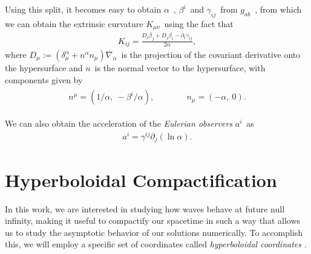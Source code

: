 Using this split, it becomes easy to obtain $\alpha$~, $\beta^i$~and $\gamma_{ij}$~from $g_{ab}$~, from which we can obtain the extrinsic curvature $K_{\mu\nu}$~using the fact that
%
\begin{align}
 K_{ij} = \frac{D_i \beta_j + D_j \beta_i - \partial_t \gamma_{ij}}{2 \alpha},
\end{align}
%
where $D_\mu := (\delta^\alpha_\mu + n^\alpha n_\mu) \nabla_\alpha$~is the projection of the covariant derivative onto the hypersurface and $n$~is the normal vector to the hypersurface, with components given by
%
\begin{align}
    \begin{aligned}
        n^\mu = (1/\alpha,~-\beta^i/\alpha), 
        & \quad \quad \quad n_\mu = (-\alpha,~0).
    \end{aligned}
\end{align}

We can also obtain the acceleration of the \textit{Eulerian observers} $a^i$~as
\begin{align}
 a^i = \gamma^{ij} \partial_j(\ln \alpha).
\end{align}


\section{Hyperboloidal Compactification}
\label{section:compactification}

In this work, we are interested in studying how waves behave at future null infinity, making it useful to compactify our spacetime in such a way that allows us to study the asymptotic behavior of our solutions numerically. To accomplish this, we will employ a specific set of coordinates called \textit{hyperboloidal coordinates} \cite{Hyperboloidal_layers_for_hyperbolic_equations_on_unbounded_domains,The_evolution_of_hyperboloidal_data_with_the_dual_foliation_formalism_Mathematical_analysis_and_wave_equation_tests}. 

